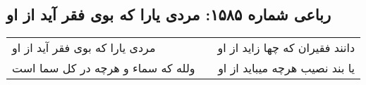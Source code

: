 \begin{center}
\section*{رباعی شماره ۱۵۸۵: مردی یارا که بوی فقر آید از او}
\label{sec:1585}
\begin{longtable}{l p{0.5cm} r}
مردی یارا که بوی فقر آید از او
&&
دانند فقیران که چها زاید از او
\\
ولله که سماء و هرچه در کل سما است
&&
یا بند نصیب هرچه میباید از او
\\
\end{longtable}
\end{center}
